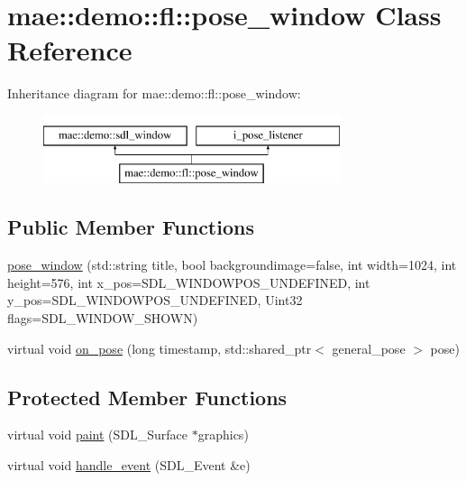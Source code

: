 \hypertarget{classmae_1_1demo_1_1fl_1_1pose__window}{\section{mae\-:\-:demo\-:\-:fl\-:\-:pose\-\_\-window Class Reference}
\label{classmae_1_1demo_1_1fl_1_1pose__window}
}
Inheritance diagram for mae\-:\-:demo\-:\-:fl\-:\-:pose\-\_\-window\-:\begin{figure}[H]
\begin{center}
\leavevmode
\includegraphics[height=2.000000cm]{classmae_1_1demo_1_1fl_1_1pose__window}
\end{center}
\end{figure}
\subsection*{Public Member Functions}
\begin{DoxyCompactItemize}
\item 
\hyperlink{classmae_1_1demo_1_1fl_1_1pose__window_a63d9c4c64ec9471438da845fa0d9b92b}{pose\-\_\-window} (std\-::string title, bool backgroundimage=false, int width=1024, int height=576, int x\-\_\-pos=S\-D\-L\-\_\-\-W\-I\-N\-D\-O\-W\-P\-O\-S\-\_\-\-U\-N\-D\-E\-F\-I\-N\-E\-D, int y\-\_\-pos=S\-D\-L\-\_\-\-W\-I\-N\-D\-O\-W\-P\-O\-S\-\_\-\-U\-N\-D\-E\-F\-I\-N\-E\-D, Uint32 flags=S\-D\-L\-\_\-\-W\-I\-N\-D\-O\-W\-\_\-\-S\-H\-O\-W\-N)
\item 
virtual void \hyperlink{classmae_1_1demo_1_1fl_1_1pose__window_adadc757a6ee3c70e3b3bf3500af6f60a}{on\-\_\-pose} (long timestamp, std\-::shared\-\_\-ptr$<$ general\-\_\-pose $>$ pose)
\end{DoxyCompactItemize}
\subsection*{Protected Member Functions}
\begin{DoxyCompactItemize}
\item 
virtual void \hyperlink{classmae_1_1demo_1_1fl_1_1pose__window_ab0677340d0c6b80216eb78467a02449d}{paint} (S\-D\-L\-\_\-\-Surface $\ast$graphics)
\item 
virtual void \hyperlink{classmae_1_1demo_1_1fl_1_1pose__window_af7734881adeb962b6119ae7548513541}{handle\-\_\-event} (S\-D\-L\-\_\-\-Event \&e)
\end{DoxyCompactItemize}
